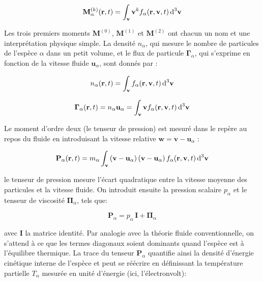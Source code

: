\begin{refsection}
\begin{equation}
\mathbf M^{(k)}_\alpha(\mathbf
r,t)=\int_{\mathbf v}\mathbf{v}^k f_\alpha(\mathbf r,\mathbf v,t)
\,\text{d}^{{3}}\mathbf{v}
\end{equation}

Les trois premiers moments $\mathbf M^{(0)}$, $\mathbf M^{(1)}$ et $\mathbf
M^{(2)}$ ont chacun un nom et une interprétation physique simple. La densité
$n_\alpha$, qui mesure le nombre de particules de l'espèce $\alpha$ dans un
petit volume, et le flux de particule $\boldsymbol{\Gamma}_\alpha$, qui
s'exprime en fonction de la vitesse fluide $\mathbf u_\alpha$, sont
donnés par :

\begin{equation}
n_\alpha(\mathbf
r,t)=\int_{\mathbf v} f_\alpha(\mathbf r,\mathbf v,t)
\,\text{d}^{{3}}\mathbf{v}
\end{equation}

\begin{equation}
\boldsymbol{\Gamma}_\alpha(\mathbf
r,t)=n_\alpha\mathbf u_\alpha=\int_{\mathbf v} \mathbf v f_\alpha(\mathbf
r,\mathbf v,t) \,\text{d}^{{3}}\mathbf{v}
\end{equation}

Le moment d'ordre deux (le tenseur de pression) est mesuré dans le repère au
repos du fluide en introduisant la vitesse relative $\mathbf w=\mathbf
v-\mathbf u_\alpha$ : 

\begin{equation}
\mathbf P_\alpha(\mathbf
r,t)=m_\alpha\int_{\mathbf v} \left(\mathbf
v-\mathbf u_\alpha\right)\left(\mathbf
v-\mathbf u_\alpha\right)
f_\alpha(\mathbf r,\mathbf v,t) \,\text{d}^{{3}}\mathbf{v}
\end{equation}

le tenseur de pression mesure l'écart quadratique entre la vitesse moyenne des
particules et la vitesse fluide. On introduit ensuite la
pression scalaire $p_\alpha$ et le tenseur de viscosité
$\boldsymbol{\Pi}_\alpha$, tels que:

\begin{equation}
\label{1-tenseurPression}
\mathbf P_\alpha=p_\alpha\,\mathbf I + \boldsymbol{\Pi}_\alpha
\end{equation}

avec $\mathbf I$ la matrice identité. Par analogie avec la théorie fluide
conventionnelle, on s'attend à ce que les termes diagonaux soient dominants
quand l'espèce est à l'équilibre thermique. La trace du tenseur
$\mathbf P_\alpha$ quantifie ainsi la densité d'énergie cinétique
interne de l'espèce et peut se réécrire en définissant la température partielle 
$T_\alpha$ mesurée en unité d'énergie (ici, l'électronvolt):


\end{refsection}
